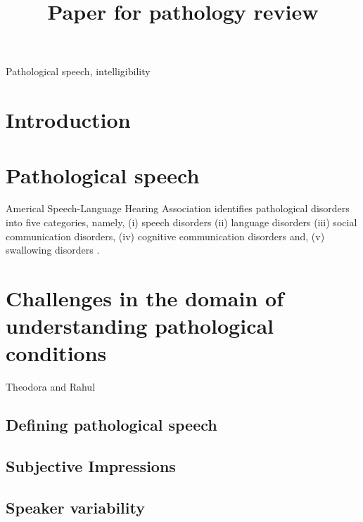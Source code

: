 \documentclass{article}
\title{Paper for pathology review}
\begin{document}
\ninept
%
\maketitle
%
\begin{abstract}
 
\end{abstract}
%
\begin{keywords}
Pathological speech, intelligibility 
\end{keywords}
%
\section{Introduction}
\label{sec:intro}

\section{Pathological speech}
Americal Speech-Language Hearing Association identifies pathological disorders into five categories, namely, (i) speech disorders (ii) language disorders (iii) social communication disorders, (iv) cognitive communication disorders and, (v) swallowing disorders \cite{american2008council}. 


\section{Challenges in the domain of understanding pathological conditions}
Theodora and Rahul

\subsection{Defining pathological speech}

\subsection{Subjective Impressions}

\subsection{Speaker variability}
\end{document}
